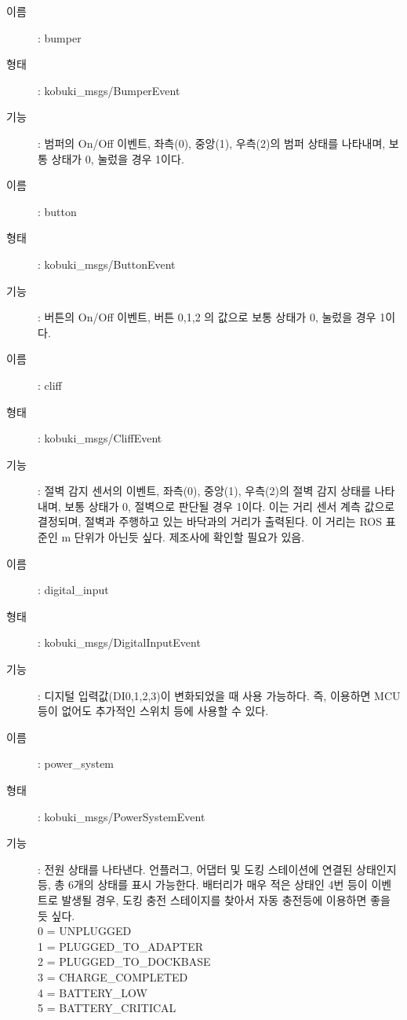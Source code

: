 \vspace{\baselineskip}
\begin{description}
\item[이름]: bumper
\item[형태]: kobuki\_msgs/BumperEvent
\item[기능]: 범퍼의 On/Off 이벤트, 좌측(0), 중앙(1), 우측(2)의 범퍼 상태를 나타내며, 보통 상태가 0, 눌렀을 경우 1이다.
\end{description}

\vspace{\baselineskip}
\begin{description}
\item[이름]: button
\item[형태]: kobuki\_msgs/ButtonEvent
\item[기능]: 버튼의 On/Off 이벤트, 버튼 0,1,2 의 값으로 보통 상태가 0, 눌렀을 경우 1이다.
\end{description}

\vspace{\baselineskip}
\begin{description}
\item[이름]: cliff
\item[형태]: kobuki\_msgs/CliffEvent
\item[기능]: 절벽 감지 센서의 이벤트, 좌측(0), 중앙(1), 우측(2)의 절벽 감지 상태를 나타내며, 보통 상태가 0, 절벽으로 판단될 경우 1이다. 이는 거리 센서 계측 값으로 결정되며, 절벽과 주행하고 있는 바닥과의 거리가 출력된다. 이 거리는 ROS 표준인 m 단위가 아닌듯 싶다. 제조사에 확인할 필요가 있음.
\end{description}

\vspace{\baselineskip}
\begin{description}
\item[이름]: digital\_input
\item[형태]: kobuki\_msgs/DigitalInputEvent
\item[기능]: 디지털 입력값(DI0,1,2,3)이 변화되었을 때 사용 가능하다. 즉, 이용하면 MCU 등이 없어도 추가적인 스위치 등에 사용할 수 있다.
\end{description}

\vspace{\baselineskip}
\begin{description}
\item[이름]: power\_system
\item[형태]: kobuki\_msgs/PowerSystemEvent
\item[기능]: 전원 상태를 나타낸다. 언플러그, 어댑터 및 도킹 스테이션에 연결된 상태인지 등, 총 6개의 상태를 표시 가능한다. 배터리가 매우 적은 상태인 4번 등이 이벤트로 발생될 경우, 도킹 충전 스테이지를 찾아서 자동 충전등에 이용하면 좋을 듯 싶다.\\
0 = UNPLUGGED\\
1 = PLUGGED\_TO\_ADAPTER\\
2 = PLUGGED\_TO\_DOCKBASE\\
3 = CHARGE\_COMPLETED\\
4 = BATTERY\_LOW\\
5 = BATTERY\_CRITICAL
\end{description}

